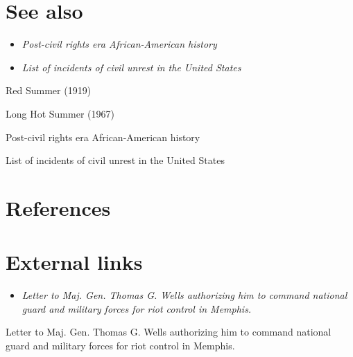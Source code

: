 \section{See also}\label{see-also}

\begin{itemize}
\item
  \emph{Post-civil rights era African-American history}
\item
  \emph{List of incidents of civil unrest in the United States}
\end{itemize}

Red Summer (1919)

Long Hot Summer (1967)

Post-civil rights era African-American history

List of incidents of civil unrest in the United States

\section{References}\label{references}

\section{External links}\label{external-links}

\begin{itemize}
\item
  \emph{Letter to Maj. Gen. Thomas G. Wells authorizing him to command
  national guard and military forces for riot control in Memphis.}
\end{itemize}

Letter to Maj. Gen. Thomas G. Wells authorizing him to command national
guard and military forces for riot control in Memphis.
